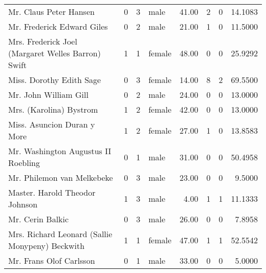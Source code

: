 \begin{tabular}{lrrlrrrr}
Mr. Claus Peter Hansen                             &         0 &       3 &    male &  41.00 &                        2 &                        0 &   14.1083 \\
Mr. Frederick Edward Giles                         &         0 &       2 &    male &  21.00 &                        1 &                        0 &   11.5000 \\
Mrs. Frederick Joel (Margaret Welles Barron) Swift &         1 &       1 &  female &  48.00 &                        0 &                        0 &   25.9292 \\
Miss. Dorothy Edith Sage                           &         0 &       3 &  female &  14.00 &                        8 &                        2 &   69.5500 \\
Mr. John William Gill                              &         0 &       2 &    male &  24.00 &                        0 &                        0 &   13.0000 \\
Mrs. (Karolina) Bystrom                            &         1 &       2 &  female &  42.00 &                        0 &                        0 &   13.0000 \\
Miss. Asuncion Duran y More                        &         1 &       2 &  female &  27.00 &                        1 &                        0 &   13.8583 \\
Mr. Washington Augustus II Roebling                &         0 &       1 &    male &  31.00 &                        0 &                        0 &   50.4958 \\
Mr. Philemon van Melkebeke                         &         0 &       3 &    male &  23.00 &                        0 &                        0 &    9.5000 \\
Master. Harold Theodor Johnson                     &         1 &       3 &    male &   4.00 &                        1 &                        1 &   11.1333 \\
Mr. Cerin Balkic                                   &         0 &       3 &    male &  26.00 &                        0 &                        0 &    7.8958 \\
Mrs. Richard Leonard (Sallie Monypeny) Beckwith    &         1 &       1 &  female &  47.00 &                        1 &                        1 &   52.5542 \\
Mr. Frans Olof Carlsson                            &         0 &       1 &    male &  33.00 &                        0 &                        0 &    5.0000 \\

\end{tabular}

